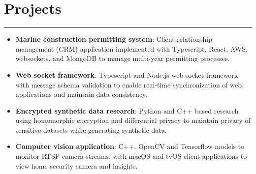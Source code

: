 \documentclass[letterpaper,11pt]{article}
\begin{document}
\section*{Projects}
\hrule
\begin{itemize}[leftmargin=*,nosep]
  \item \textbf{Marine construction permitting system}: Client relationship management (CRM) application implemented with Typescript, React, AWS, websockets, and MongoDB to manage multi-year permitting processes.
  \item \textbf{Web socket framework}: Typescript and Node.js web socket framework with message schema validation to enable real-time synchronization of web applications and maintain data consistency.
  \item \textbf{Encrypted synthetic data research}: Python and C++ based research using homomorphic encryption and differential privacy to maintain privacy of sensitive datasets while generating synthetic data.
  \item \textbf{Computer vision application}: C++, OpenCV and Tensorflow models to monitor RTSP camera streams, with macOS and tvOS client applications to view home security camera and insights.
\end{itemize}

\vspace{-10px}
\end{document}
